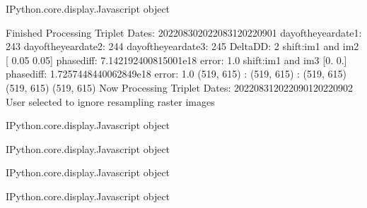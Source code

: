 \documentclass[letterpaper,10pt]{sphinxmanual}
\begin{document}
\begin{sphinxVerbatim}[commandchars=\\\{\}]
\PYGZlt{}IPython.core.display.Javascript object\PYGZgt{}
\end{sphinxVerbatim}



\begin{sphinxVerbatim}[commandchars=\\\{\}]
Finished Processing Triplet Dates:  20220830\PYGZhy{}20220831\PYGZhy{}20220901
day\PYGZus{}of\PYGZus{}the\PYGZus{}year\PYGZus{}date1:  243
\PYGZhy{}\PYGZhy{}\PYGZhy{}\PYGZhy{}\PYGZhy{}\PYGZhy{}\PYGZhy{}\PYGZhy{}\PYGZhy{}\PYGZhy{}\PYGZhy{}\PYGZhy{}\PYGZhy{}\PYGZhy{}\PYGZhy{}\PYGZhy{}\PYGZhy{}\PYGZhy{}\PYGZhy{}\PYGZhy{}\PYGZhy{}
day\PYGZus{}of\PYGZus{}the\PYGZus{}year\PYGZus{}date2:  244
\PYGZhy{}\PYGZhy{}\PYGZhy{}\PYGZhy{}\PYGZhy{}\PYGZhy{}\PYGZhy{}\PYGZhy{}\PYGZhy{}\PYGZhy{}\PYGZhy{}\PYGZhy{}\PYGZhy{}\PYGZhy{}\PYGZhy{}\PYGZhy{}\PYGZhy{}\PYGZhy{}\PYGZhy{}\PYGZhy{}\PYGZhy{}
day\PYGZus{}of\PYGZus{}the\PYGZus{}year\PYGZus{}date3:  245
\PYGZhy{}\PYGZhy{}\PYGZhy{}\PYGZhy{}\PYGZhy{}\PYGZhy{}\PYGZhy{}\PYGZhy{}\PYGZhy{}\PYGZhy{}\PYGZhy{}\PYGZhy{}\PYGZhy{}\PYGZhy{}\PYGZhy{}\PYGZhy{}\PYGZhy{}\PYGZhy{}\PYGZhy{}\PYGZhy{}\PYGZhy{}
Delta\PYGZus{}DD: 2
shift:im1 and im2 [ 0.05 \PYGZhy{}0.05] phasediff: 7.142192400815001e\PYGZhy{}18 error: 1.0
shift:im1 and im3 [0. 0.] phasediff: \PYGZhy{}1.7257448440062849e\PYGZhy{}18 error: 1.0
(519, 615) :  (519, 615) :  (519, 615)
(519, 615)
(519, 615)
Now Processing Triplet Dates:  20220831\PYGZhy{}20220901\PYGZhy{}20220902
 User selected to ignore resampling raster images 



\PYGZlt{}IPython.core.display.Javascript object\PYGZgt{}
\end{sphinxVerbatim}



\begin{sphinxVerbatim}[commandchars=\\\{\}]
\PYGZlt{}IPython.core.display.Javascript object\PYGZgt{}
\end{sphinxVerbatim}



\begin{sphinxVerbatim}[commandchars=\\\{\}]
\PYGZlt{}IPython.core.display.Javascript object\PYGZgt{}
\end{sphinxVerbatim}



\begin{sphinxVerbatim}[commandchars=\\\{\}]
\PYGZlt{}IPython.core.display.Javascript object\PYGZgt{}
\end{sphinxVerbatim}
\end{document}
